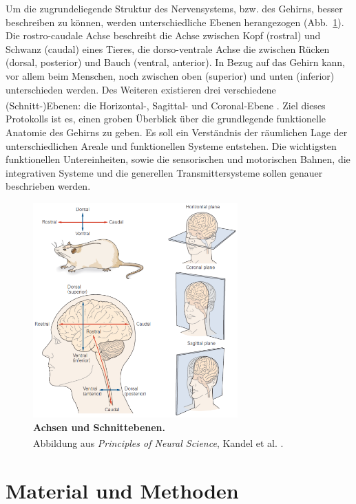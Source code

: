 \documentclass[12pt,a4paper,pdftex]{article}
\begin{document}
Um die zugrundeliegende Struktur des Nervensystems, bzw. des Gehirns, besser beschreiben zu können, werden unterschiedliche Ebenen herangezogen (Abb.~\ref{fig:schnittebenen}). Die rostro-caudale Achse beschreibt die Achse zwischen Kopf (rostral) und Schwanz (caudal) eines Tieres, die dorso-ventrale Achse die zwischen Rücken (dorsal, posterior) und Bauch (ventral, anterior). In Bezug auf das Gehirn kann, vor allem beim Menschen, noch zwischen oben (superior) und unten (inferior) unterschieden werden. Des Weiteren existieren drei verschiedene (Schnitt-)Ebenen: die Horizontal-, Sagittal- und Coronal-Ebene \textsuperscript{\cite[15]{kandel2013principles}}. Ziel dieses Protokolls ist es, einen groben Überblick über die grundlegende funktionelle Anatomie des Gehirns zu geben. Es soll ein Verständnis der räumlichen Lage der unterschiedlichen Areale und funktionellen Systeme entstehen. Die wichtigsten funktionellen Untereinheiten, sowie die sensorischen und motorischen Bahnen, die integrativen Systeme und die generellen Transmittersysteme sollen genauer beschrieben werden.

\begin{figure}[H]
    \centering
    \includegraphics[width=0.7\textwidth]{pictures/Bilder_Jule/Andere/Schnittebenen.png}
    \caption[Achsen und Schnittebenen]{\textbf{Achsen und Schnittebenen.}\\
    Abbildung aus \textit{Principles  of Neural Science}, Kandel et al. \textsuperscript{\cite[15]{kandel2013principles}}.}
    \label{fig:schnittebenen}
\end{figure}{}


\newpage
\section{Material und Methoden}
\end{document}
